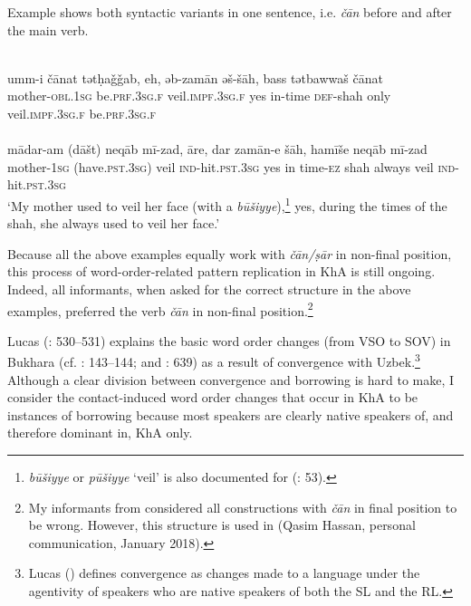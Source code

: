 \documentclass[output=paper,nonflat]{langsci/langscibook}
\begin{document}
Example  shows both syntactic variants in one sentence, i.e. \textit{čān} before and after the main verb.

\ea\label{mother} \\
\gll umm-i čānat tətḥaǧǧab, eh, əb-zamān əš-šāh, bass tətbawwaš čānat\\
     mother-\textsc{obl.1sg} be\textsc{.prf.3sg.f} veil.\textsc{impf.3sg.f} yes in-time \textsc{def}{}-shah only veil.\textsc{impf.3sg.f} be\textsc{.prf.3sg.f}\\

\\
\gll mādar-am (dāšt) neqāb mī-zad, āre, dar zamān-e šāh, hamīše neqāb mī-zad \\
     mother-\textsc{1sg} (have.\textsc{pst.3sg}) veil \textsc{ind}-hit.\textsc{pst.3sg} yes in time-\textsc{ez} shah always veil \textsc{ind}-hit.\textsc{pst.3sg}\\
\glt  ‘My mother used to veil her face (with a \textit{būšiyye}),\footnote{\textit{būšiyye} or \textit{pūšiyye} ‘veil’ is also documented for   (\citealt{WoodheadEtAl1967}: 53).} yes, during the times of the shah, she always used to veil her face.’ 
\z\z

Because all the above examples equally work with \textit{čān/ṣār} in non-final position, this process of word-order-related pattern {replication} in KhA is still ongoing. Indeed, all informants, when asked for the correct structure in the above examples, preferred the verb \textit{čān} in non-final position.\footnote{My informants from  considered all constructions with \textit{čān} in final position to be wrong. However, this structure is used in   (Qasim Hassan, personal communication, January 2018).}

Lucas (\citeyear{Lucas2015}: 530–531) explains the basic {word order} changes (from VSO to SOV) in Bukhara  (cf. \citealt{Ratcliffe2005}: 143–144; and \citealt{Versteegh2010}: 639) as a result of {convergence} with Uzbek.\footnote{Lucas (\citeyear[525]{Lucas2015}) defines {convergence} as changes made to a language under the agentivity of speakers who are native speakers of both the {SL} and the {RL}.} Although a clear division between {convergence} and borrowing is hard to make, I consider the contact-induced {word order} changes that occur in KhA to be instances of borrowing because most speakers are clearly native speakers of, and therefore dominant in, KhA only.
\end{document}
